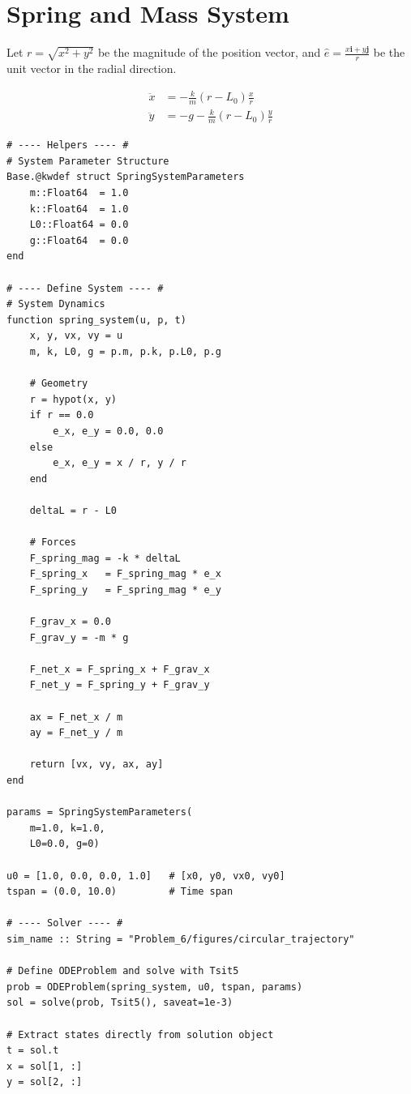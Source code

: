 \section{Spring and Mass System}

Let $r = \sqrt{x^2 + y^2}$ be the magnitude of the position vector, and $\hat{e} = \frac{x\mathbf{i} + y\mathbf{j}}{r}$ be the unit vector in the radial direction.

\begin{align}
    \ddot{x} &= -\frac{k}{m} \left( r - L_0 \right) \frac{x}{r} \label{eqn:question7_eomx}\\
    \ddot{y} &= -g - \frac{k}{m} \left( r - L_0 \right) \frac{y}{r} \label{eqn:question7_eomy}
\end{align}

\begin{verbatim}
# ---- Helpers ---- #
# System Parameter Structure
Base.@kwdef struct SpringSystemParameters
    m::Float64  = 1.0
    k::Float64  = 1.0
    L0::Float64 = 0.0
    g::Float64  = 0.0
end

# ---- Define System ---- #
# System Dynamics
function spring_system(u, p, t)
    x, y, vx, vy = u
    m, k, L0, g = p.m, p.k, p.L0, p.g

    # Geometry
    r = hypot(x, y)
    if r == 0.0
        e_x, e_y = 0.0, 0.0
    else
        e_x, e_y = x / r, y / r
    end

    deltaL = r - L0

    # Forces
    F_spring_mag = -k * deltaL
    F_spring_x   = F_spring_mag * e_x
    F_spring_y   = F_spring_mag * e_y

    F_grav_x = 0.0
    F_grav_y = -m * g

    F_net_x = F_spring_x + F_grav_x
    F_net_y = F_spring_y + F_grav_y

    ax = F_net_x / m
    ay = F_net_y / m

    return [vx, vy, ax, ay]
end

params = SpringSystemParameters(
    m=1.0, k=1.0,
    L0=0.0, g=0)

u0 = [1.0, 0.0, 0.0, 1.0]   # [x0, y0, vx0, vy0]
tspan = (0.0, 10.0)         # Time span

# ---- Solver ---- #
sim_name :: String = "Problem_6/figures/circular_trajectory"

# Define ODEProblem and solve with Tsit5
prob = ODEProblem(spring_system, u0, tspan, params)
sol = solve(prob, Tsit5(), saveat=1e-3)

# Extract states directly from solution object
t = sol.t
x = sol[1, :]
y = sol[2, :]
\end{verbatim}


